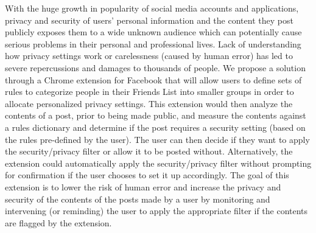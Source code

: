 \tab With the huge growth in popularity of social media accounts and applications, privacy and security of users' personal information and the content they post publicly exposes them to a wide unknown audience which can potentially cause serious problems in their personal and professional lives. Lack of understanding how privacy settings work or carelessness (caused by human error) has led to severe repercussions and damages to thousands of people. We propose a solution through a Chrome extension for Facebook that will allow users to define sets of rules to categorize people in their Friends List into smaller groups in order to allocate personalized privacy settings. This extension would then analyze the contents of a post, prior to being made public, and measure the contents against a rules dictionary and determine if the post requires a security setting (based on the rules pre-defined by the user). The user can then decide if they want to apply the security/privacy filter or allow it to be posted without. Alternatively, the extension could automatically apply the security/privacy filter without prompting for confirmation if the user chooses to set it up accordingly. The goal of this extension is to lower the risk of human error and increase the privacy and security of the contents of the posts made by a user by monitoring and intervening (or reminding) the user to apply the appropriate filter if the contents are flagged by the extension.